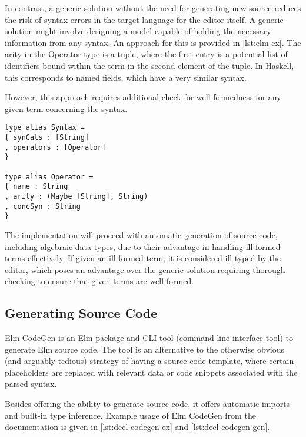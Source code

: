 \documentclass[sigplan,screen]{acmart}
\begin{document}
In contrast, a generic solution without the need for generating new source reduces the risk of syntax errors in the target language for the editor itself. A generic solution might involve designing a model capable of holding the necessary information from any syntax. An approach for this is provided in \cref{lst:elm-ex}.
The arity in the Operator type is a tuple, where the first entry is a potential
list of identifiers bound within the term in the second element of the tuple.
In Haskell, this corresponds to named fields\cite{haskell-records-named-fields},
which have a very similar syntax.

However, this approach requires additional check for well-formedness
for any given term concerning the syntax.

\begin{minipage}{\linewidth}
  \begin{lstlisting}[style=inline,caption={Elm Records for storing syntax information},label={lst:elm-ex}]
type alias Syntax =
{ synCats : [String]
, operators : [Operator]
}

type alias Operator =
{ name : String
, arity : (Maybe [String], String)
, concSyn : String
}
\end{lstlisting}
\end{minipage}

The implementation will proceed with automatic generation of source code,
including algebraic data types, due to their advantage in handling ill-formed
terms effectively. If given an ill-formed term, it is considered ill-typed by
the editor, which poses an advantage over the generic solution requiring
thorough checking to ensure that given terms are well-formed.

\subsection{Generating Source Code}
Elm CodeGen\cite{elm-codegen-package} is an Elm package and
CLI tool (command-line interface tool) to generate Elm source code.
The tool is an alternative to the otherwise obvious (and arguably tedious)
strategy of having a source code template, where certain placeholders are
replaced with relevant data or code snippets associated with the parsed syntax.

Besides offering the ability to generate source code, it offers automatic
imports and built-in type inference. Example usage of Elm CodeGen from
the documentation\cite{elm-codegen-package} is given in \cref{lst:decl-codegen-ex} and \cref{lst:decl-codegen-gen}.
\end{document}
